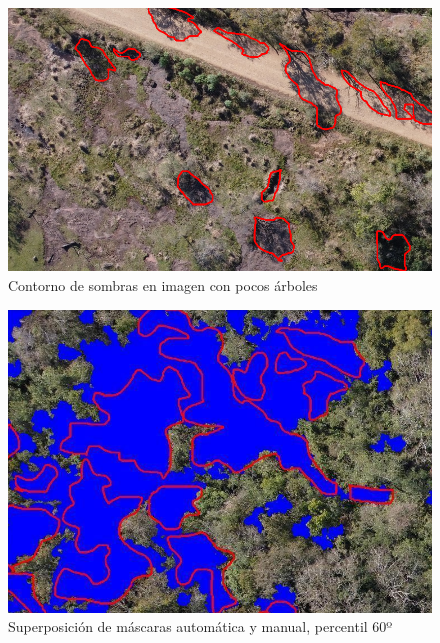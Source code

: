 \begin{figure}[H]
    \includegraphics[width=\textwidth]{Imagenes/contours2.png}
     \hfill
     \caption{Contorno de sombras en imagen con pocos árboles}
    \label{contorno2}
\end{figure}

\begin{figure}[H]
     
         \includegraphics[width=\textwidth]{Imagenes/superposition of masks.png}
         \caption{Superposición de máscaras automática y manual, percentil 60º}
         \label{p60}
\end{figure}
     \hfill
     
